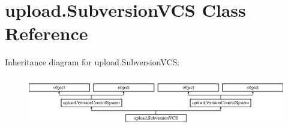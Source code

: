 \hypertarget{classupload_1_1_subversion_v_c_s}{}\section{upload.\+Subversion\+V\+CS Class Reference}
\label{classupload_1_1_subversion_v_c_s}
Inheritance diagram for upload.\+Subversion\+V\+CS\+:\begin{figure}[H]
\begin{center}
\leavevmode
\includegraphics[height=2.245989cm]{df/d5b/classupload_1_1_subversion_v_c_s}
\end{center}
\end{figure}

